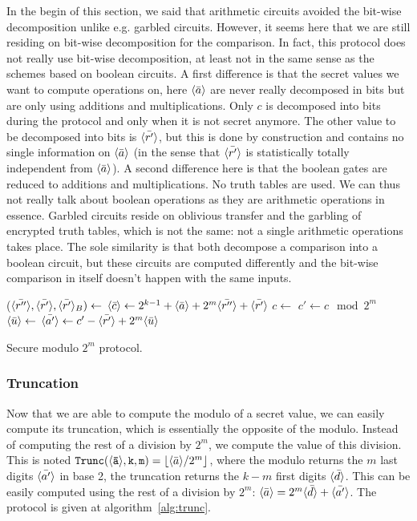In the begin of this section, we said that arithmetic circuits avoided the bit-wise decomposition unlike e.g. garbled circuits. However, it seems here that we are still residing on bit-wise decomposition for the comparison. In fact, this protocol does not really use bit-wise decomposition, at least not in the same sense as the schemes based on boolean circuits. A first difference is that the secret values we want to compute operations on, here $\langle \bar{a} \rangle$ are never really decomposed in bits but are only using additions and multiplications. Only $c$ is decomposed into bits during the protocol and only when it is not secret anymore. The other value to be decomposed into bits is $\langle \bar{r'} \rangle$, but this is done by construction and contains no single information on $\langle \bar{a} \rangle$ (in the sense that $\langle \bar{r'} \rangle$ is statistically totally independent from $\langle \bar{a} \rangle$). A second difference here is that the boolean gates are reduced to additions and multiplications. No truth tables are used. We can thus not really talk about boolean operations as they are arithmetic operations in essence. Garbled circuits reside on oblivious transfer and the garbling of encrypted truth tables, which is not the same: not a single arithmetic operations takes place. The sole similarity is that both decompose a comparison into a boolean circuit, but these circuits are computed differently and the bit-wise comparison in itself doesn't happen with the same inputs.

\begin{center}
\begin{algorithm}[H]
\DontPrintSemicolon
{}
($\langle \bar{r''} \rangle, \langle \bar{r'} \rangle, \langle \bar{r'} \rangle_B) \leftarrow$  \;
$\langle \bar{c} \rangle \leftarrow 2^{k-1} + \langle \bar{a} \rangle + 2^m\langle \bar{r''} \rangle + \langle \bar{r'} \rangle$ \;
$c \leftarrow$  \;
$c' \leftarrow c \mod 2^m$ \;
$\langle \bar{u} \rangle \leftarrow$  \;
$\langle \bar{a'} \rangle \leftarrow c' - \langle \bar{r'} \rangle + 2^m\langle \bar{u} \rangle$ \;
\caption{Secure modulo $2^m$ protocol.}
\label{alg:mod2m}
\end{algorithm}
\end{center}

\subsubsection{Truncation}
Now that we are able to compute the modulo of a secret value, we can easily compute its truncation, which is essentially the opposite of the modulo. Instead of computing the rest of a division by $2^m$, we compute the value of this division. This is noted $\mathtt{Trunc(\langle \bar{a} \rangle,k,m)} = \lfloor \langle \bar{a} \rangle/2^m \rfloor$, where the modulo returns the $m$ last digits $\langle \bar{a'} \rangle$ in base 2, the truncation returns the $k-m$ first digits $\langle \bar{d} \rangle$. This can be easily computed using the rest of a division by $2^m$: $\langle \bar{a} \rangle = 2^m\langle \bar{d} \rangle + \langle \bar{a'} \rangle$. The protocol is given at algorithm~\ref{alg:trunc}.

